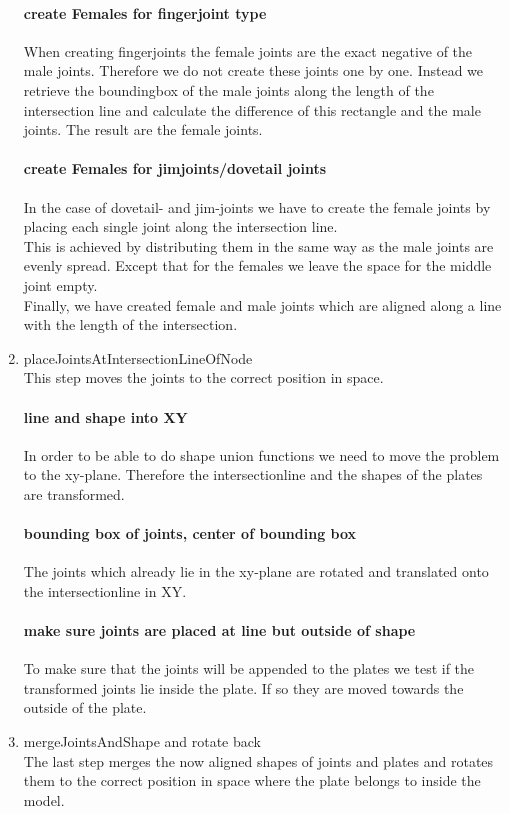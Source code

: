 \documentclass[../ClassicThesis.tex]{subfiles}
\begin{document}
\begin{enumerate}
            \paragraph{create Females for fingerjoint type}
            When creating fingerjoints the female joints are the exact negative of the male joints. Therefore we do not create these joints one by one. Instead we retrieve the boundingbox of the male joints along the length of the intersection line and calculate the difference of this rectangle and the male joints. The result are the female joints.
            \paragraph{create Females for jimjoints/dovetail joints}
            In the case of dovetail- and jim-joints we have to create the female joints by placing each single joint along the intersection line.\\
            This is achieved by distributing them in the same way as the male joints are evenly spread. Except that for the females we leave the space for the middle joint empty.\\
        Finally, we have created female and male joints which are aligned along a line with the length of the intersection.
    
    \item placeJointsAtIntersectionLineOfNode\\
        This step moves the joints to the correct position in space. 
            \paragraph{line and shape into XY}
            In order to be able to do shape union functions we need to move the problem to the xy-plane. Therefore the intersectionline and the shapes of the plates are transformed.
            \paragraph{bounding box of joints, center of bounding box}
            The joints which already lie in the xy-plane are rotated and translated onto the intersectionline in XY.
            \paragraph{make sure joints are placed at line but outside of shape}
            To make sure that the joints will be appended to the plates we test if the transformed joints lie inside the plate. If so they are moved towards the outside of the plate.

    \item mergeJointsAndShape and rotate back\\
        The last step merges the now aligned shapes of joints and plates and rotates them to the correct position in space where the plate belongs to inside the model.
    
\end{enumerate}
\end{document}
